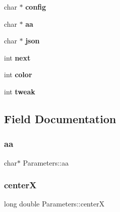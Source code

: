 \begin{DoxyCompactItemize}
\item 
\mbox{\label{struct_parameters_ab3ec51653a2131c0a7049e0a5e34e651}} 
char $\ast$ {\bfseries config}
\item 
\mbox{\label{struct_parameters_a37a1880a2aa4730679fc51040af3a976}} 
char $\ast$ {\bfseries aa}
\item 
\mbox{\label{struct_parameters_ae19686186ca51dd3c4bdd868e52dc04d}} 
char $\ast$ {\bfseries json}
\item 
\mbox{\label{struct_parameters_a48e77fdf8acb086d2fdc2934ca2d10d3}} 
int {\bfseries next}
\item 
\mbox{\label{struct_parameters_a0ec9c97da0f7373e9c2b4f898ff76e46}} 
int {\bfseries color}
\item 
\mbox{\label{struct_parameters_a1962cf70d9f60c9b1b6d567a0152776b}} 
int {\bfseries tweak}
\end{DoxyCompactItemize}


\subsection{Field Documentation}
\mbox{\label{struct_parameters_a37a1880a2aa4730679fc51040af3a976}} 
\subsubsection{\texorpdfstring{aa}{aa}}
{\footnotesize\ttfamily char$\ast$ Parameters\+::aa}

\mbox{\label{struct_parameters_a77a4b596ca7a32175d60ff750748af21}} 
\subsubsection{\texorpdfstring{centerX}{centerX}}
{\footnotesize\ttfamily long double Parameters\+::centerX}

\mbox{\label{struct_parameters_a9f486cabe8205f5c1ee65ecc885e4b86}} 

